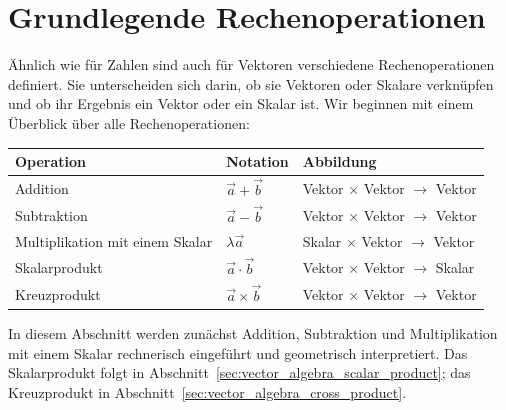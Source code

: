 \section{Grundlegende Rechenoperationen}
\label{sec:vector_algebra_operations}

Ähnlich wie für Zahlen sind auch für Vektoren verschiedene Rechenoperationen definiert. Sie
unterscheiden sich darin, ob sie Vektoren oder Skalare verknüpfen und ob ihr Ergebnis ein
Vektor oder ein Skalar ist. Wir beginnen mit einem Überblick über alle Rechenoperationen:

\begin{center}
  \renewcommand{\arraystretch}{1.35}
  \begin{tabularx}{0.96\linewidth}{@{}
      >{\raggedright\arraybackslash}X
      >{\centering\arraybackslash}p{3.2cm}
      >{\centering\arraybackslash}p{5.6cm}@{}}
    \toprule
    \textbf{Operation} & \textbf{Notation} & \textbf{Abbildung} \\
    \midrule
    Addition
      & $\vec a+\vec b$
      & Vektor $\times$ Vektor $\to$ Vektor \\
    Subtraktion
      & $\vec a-\vec b$
      & Vektor $\times$ Vektor $\to$ Vektor \\
    Multiplikation mit einem Skalar
      & $\lambda\vec a$
      & Skalar $\times$ Vektor $\to$ Vektor \\
    Skalarprodukt
      & $\vec a\cdot\vec b$
      & Vektor $\times$ Vektor $\to$ Skalar \\
    Kreuzprodukt
      & $\vec a\times\vec b$
      & Vektor $\times$ Vektor $\to$ Vektor \\
    \bottomrule
  \end{tabularx}
\end{center}

In diesem Abschnitt werden zunächst Addition, Subtraktion und Multiplikation
mit einem Skalar rechnerisch eingeführt und geometrisch interpretiert. Das
Skalarprodukt folgt in Abschnitt~\ref{sec:vector_algebra_scalar_product}; das
Kreuzprodukt in Abschnitt~\ref{sec:vector_algebra_cross_product}.



